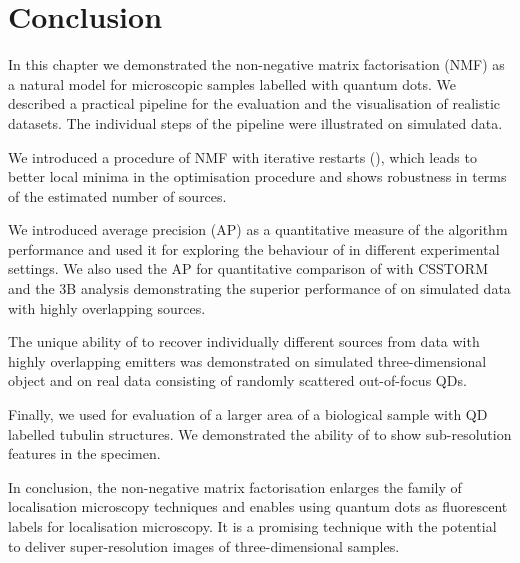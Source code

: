 \clearpage
\section{Conclusion\label{sec:Conclusion}}

In this chapter we demonstrated the non-negative matrix factorisation (NMF) as a natural model for microscopic samples labelled with quantum dots. We described a practical pipeline for the evaluation and the visualisation of realistic datasets. The individual steps of the pipeline were illustrated on simulated data.

We introduced a procedure of NMF with iterative restarts (\inmf{}), which leads to better local minima in the optimisation procedure and shows robustness in terms of the estimated number of sources. 

We introduced average precision (AP) as a quantitative measure  of the algorithm performance and used it for exploring the behaviour of \inmf{} in different experimental settings. We also used the AP for quantitative comparison of \inmf{} with CSSTORM and the 3B analysis demonstrating the superior performance of \inmf{} on simulated data with highly overlapping sources. 

The unique ability of \inmf{} to recover individually different sources from data with highly overlapping emitters was demonstrated on simulated three-dimensional object and on real data consisting of randomly scattered out-of-focus QDs. 

Finally, we used \inmf{} for evaluation of a larger area of a biological sample with QD labelled tubulin structures. We demonstrated the ability of  \inmf{} to show sub-resolution features in the specimen.

In conclusion, the non-negative matrix factorisation enlarges the family of localisation microscopy techniques and enables using quantum dots as fluorescent labels for localisation microscopy. It is a promising technique with the potential to deliver super-resolution images of three-dimensional samples. 
